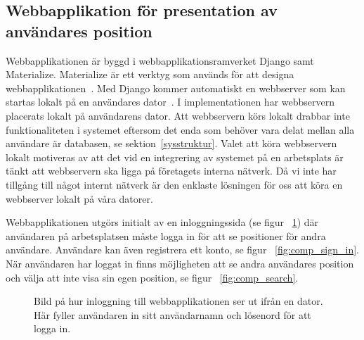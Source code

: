 \documentclass[a4paper,12pt]{article}
\begin{document}
 \subsection{Webbapplikation för presentation av användares position} \label{webbinterface}
 Webbapplikationen är byggd i webbapplikationsramverket Django samt Materialize. Materialize är ett verktyg som används för att designa webbapplikationen~\cite{materialize}. Med Django kommer automatiskt en webbserver som kan startas lokalt på en användares dator~\cite{djangoMVC}. I implementationen har webbservern placerats lokalt på användarens dator. Att webbservern körs lokalt drabbar inte funktionaliteten i systemet eftersom det enda som behöver vara delat mellan alla användare är databasen, se sektion~\ref{sysstruktur}. Valet att köra webbservern lokalt motiveras av att det vid en integrering av systemet på en arbetsplats är tänkt att webbservern ska ligga på företagets interna nätverk. Då vi inte har tillgång till något internt nätverk är den enklaste lösningen för oss att köra en webbserver lokalt på våra datorer.

 Webbapplikationen utgörs initialt av en inloggningssida (se figur ~\ref{fig:comp_log_in}) där användaren på arbetsplatsen måste logga in för att se positioner för andra användare. Användare kan även registrera ett konto, se figur ~\ref{fig:comp_sign_in}. När användaren har loggat in finns möjligheten att se andra användares position och välja att inte visa sin egen position, se figur ~\ref{fig:comp_search}.

 \begin{figure}[H]
   \centering
   \caption{Bild på hur inloggning till webbapplikationen ser ut ifrån en dator. Här fyller användaren in sitt användarnamn och lösenord för att logga in.}
   \label{fig:comp_log_in}
 \end{figure}
\end{document}

